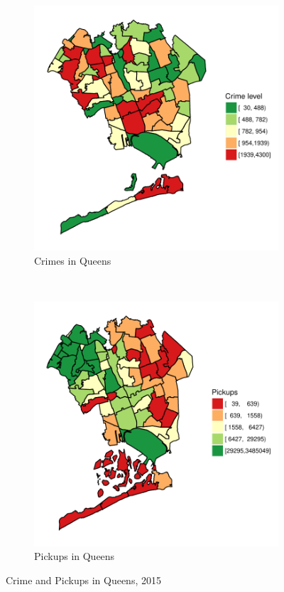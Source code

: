 \documentclass{sigkddExp}
\begin{document}
\begin{figure}
    \centering
    \begin{subfigure}[t]{0.5\textwidth}
        \centering
        \includegraphics[width=.9\textwidth]{../img/crimes_per_zone_2015_Queens}
        \caption{Crimes in Queens}
    \end{subfigure}%
    ~ 
    \begin{subfigure}[t]{0.5\textwidth}
        \centering
        \includegraphics[width=.9\textwidth]{../img/taxis_2015_Queens}
        \caption{Pickups in Queens}
    \end{subfigure}
    \caption{Crime and Pickups in Queens, 2015}
    \label{Queens}
  \end{figure}
\end{document}
